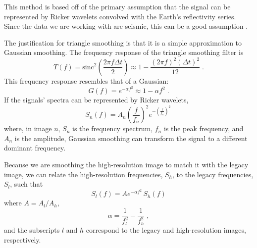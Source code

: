 
        This method is based off of the primary assumption that the signal can be represented by Ricker wavelets convolved with the Earth's reflectivity series.
        Since the data we are working with are seismic, this can be a good assumption \cite[]{ricker}.

        The justification for triangle smoothing is that it is a simple approximation to Gaussian smoothing. 
        The frequency response of the triangle smoothing filter \cite[]{pvi} is
        \begin{equation}
            \label{eq:Tf}
            T(f) = \mathrm{sinc}^2\left(\frac{2\pi f \Delta t}{2}\right) \approx 1-\frac{(2\pi f)^2(\Delta t)^2}{12}\;.
        \end{equation}
        This frequency response resembles that of a Gaussian:
        \begin{equation}
            \label{eq:gaussian}
            G(f) = e^{-\alpha f^2} \approx 1 - \alpha f^2\;.
        \end{equation}
        If the signals' spectra can be represented by Ricker wavelets,
        \begin{equation} 
            \label{eq:Sn}
            S_{n}(f) = A_{n} \left(\frac{f}{f_{n}}\right)^2e^{-\left(\frac{f}{f_{n}}\right)^{2}}\,
        \end{equation}
        where, in image $n$, $S_n$ is the frequency spectrum, $f_n$ is the peak frequency, and $A_n$ is the amplitude, Gaussian smoothing can transform the signal to a different dominant frequency.
        
        Because we are smoothing the high-resolution image to match it with the legacy image, we can relate the high-resolution frequencies, $S_h$, to the legacy frequencies, $S_l$, such that
        \begin{equation} 
            \label{eq:smooth}
            S_{l}(f)=A e^{-\alpha f^2}\,S_h(f)      
        \end{equation}
        where $A=A_l/A_h$,
        \begin{equation}
            \label{eq:alpha}
            \alpha = \frac{1}{f_l^2}-\frac{1}{f_h^2} \;,
        \end{equation}
        and the subscripts $l$ and $h$ correspond to the legacy and high-resolution images, respectively.
        
